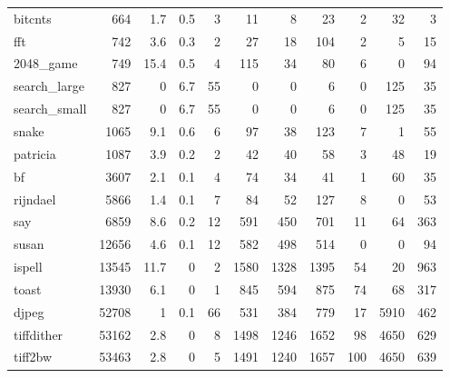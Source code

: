 \begin{tabular}{lrrrrrrrrrr}
 bitcnts         &            664 &      1.7 &    0.5 &    3 &     11 &          8 &           23 &     2 &    32 &     3 \\
 fft             &            742 &      3.6 &    0.3 &    2 &     27 &         18 &          104 &     2 &     5 &    15 \\
 2048\_game       &            749 &     15.4 &    0.5 &    4 &    115 &         34 &           80 &     6 &     0 &    94 \\
 search\_large    &            827 &      0   &    6.7 &   55 &      0 &          0 &            6 &     0 &   125 &    35 \\
 search\_small    &            827 &      0   &    6.7 &   55 &      0 &          0 &            6 &     0 &   125 &    35 \\
 snake           &           1065 &      9.1 &    0.6 &    6 &     97 &         38 &          123 &     7 &     1 &    55 \\
 patricia        &           1087 &      3.9 &    0.2 &    2 &     42 &         40 &           58 &     3 &    48 &    19 \\
 bf              &           3607 &      2.1 &    0.1 &    4 &     74 &         34 &           41 &     1 &    60 &    35 \\
 rijndael        &           5866 &      1.4 &    0.1 &    7 &     84 &         52 &          127 &     8 &     0 &    53 \\
 say             &           6859 &      8.6 &    0.2 &   12 &    591 &        450 &          701 &    11 &    64 &   363 \\
 susan           &          12656 &      4.6 &    0.1 &   12 &    582 &        498 &          514 &     0 &     0 &    94 \\
 ispell          &          13545 &     11.7 &    0   &    2 &   1580 &       1328 &         1395 &    54 &    20 &   963 \\
 toast           &          13930 &      6.1 &    0   &    1 &    845 &        594 &          875 &    74 &    68 &   317 \\
 djpeg           &          52708 &      1   &    0.1 &   66 &    531 &        384 &          779 &    17 &  5910 &   462 \\
 tiffdither      &          53162 &      2.8 &    0   &    8 &   1498 &       1246 &         1652 &    98 &  4650 &   629 \\
 tiff2bw         &          53463 &      2.8 &    0   &    5 &   1491 &       1240 &         1657 &   100 &  4650 &   639 \\

\end{tabular}
